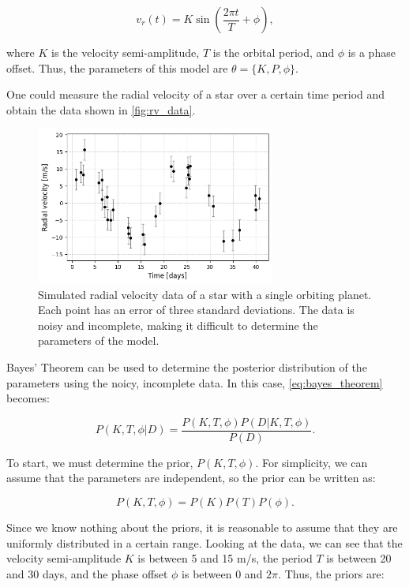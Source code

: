 \documentclass[preprint,longauthor]{aastex631}
\numberwithin{equation}{section}
\begin{document}
\begin{equation}
  \label{eq:rv_model}
  v_r(t) = K \sin\left(\frac{2\pi t}{T} + \phi\right),
\end{equation}

where $K$ is the velocity semi-amplitude, $T$ is the orbital period, and $\phi$ is a phase offset. Thus, the parameters of this model are $\theta = \{K,P,\phi\}$.

One could measure the radial velocity of a star over a certain time period and obtain the data shown in \autoref{fig:rv_data}.

\begin{figure}[ht!]
\centering
\includegraphics[width=0.7\textwidth]{../scripts/2.2/figures/data.png}
\caption{Simulated radial velocity data of a star with a single orbiting planet. Each point has an error of three standard deviations. The data is noisy and incomplete, making it difficult to determine the parameters of the model.}
\label{fig:rv_data}
\end{figure}

Bayes' Theorem can be used to determine the posterior distribution of the parameters using the noicy, incomplete data. In this case, \autoref{eq:bayes_theorem} becomes:

\begin{equation}
  P(K,T,\phi|D) = \frac{P(K,T,\phi)P(D|K,T,\phi)}{P(D)}.
\end{equation}

To start, we must determine the prior, $P(K,T,\phi)$. For simplicity, we can assume that the parameters are independent, so the prior can be written as:

\begin{equation}
  P(K,T,\phi) = P(K)P(T)P(\phi).
\end{equation}

Since we know nothing about the priors, it is reasonable to assume that they are uniformly distributed in a certain range. Looking at the data, we can see that the velocity semi-amplitude $K$ is between 5 and 15 m/s, the period $T$ is between 20 and 30 days, and the phase offset $\phi$ is between 0 and $2\pi$. Thus, the priors are:
\end{document}
